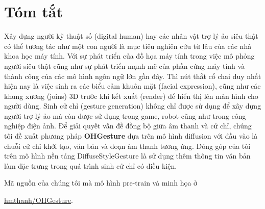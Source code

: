\chapter*{Tóm tắt}
\label{abstract}

Xây dựng người kỹ thuật số (digital human) hay các nhân vật trợ lý ảo siêu thật có thể tương tác như một con người là mục tiêu nghiên cứu từ lâu của các nhà khoa học máy tính. Với sự phát triển của đồ họa máy tính trong việc mô phỏng người siêu thật cũng như sự phát triển mạnh mẽ của phần cứng máy tính và thành công của các mô hình ngôn ngữ lớn gần đây.
Thì nút thắt cổ chai duy nhất hiện nay là việc sinh ra các biểu cảm khuôn mặt (facial expression), cũng như các khung xương (joins) 3D trước khi kết xuất (render) để hiển thị lên màn hình cho người dùng.
Sinh cử chỉ (gesture generation) không chỉ được sử dụng để xây dựng người trợ lý ảo mà còn được sử dụng trong game, robot cũng như trong công nghiệp điện ảnh.
Để giải quyết vấn đề đồng bộ giữa âm thanh và cử chỉ, chúng tôi đề xuất phương pháp \textbf{OHGesture} dựa trên mô hình diffusion với đầu vào là chuỗi cử chỉ khởi tạo, văn bản và đoạn âm thanh tương ứng.
Đóng góp của tôi trên mô hình nền tảng DiffuseStyleGesture \cite{yang2023diffusestylegesture} là sử dụng thêm thông tin văn bản làm đặc trưng trong quá trình sinh cử chỉ có điều kiện.

Mã nguồn của chúng tôi mà mô hình pre-train và minh họa ở

\href{https://github.com/hmthanh/OHGesture}{hmthanh/OHGesture}.





